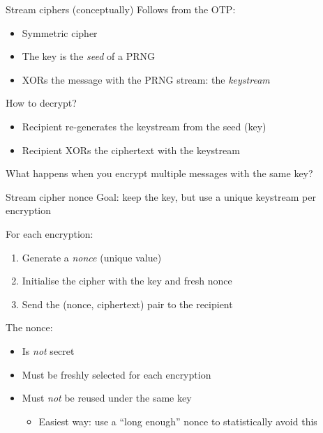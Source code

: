\begin{frame}{Stream ciphers (conceptually)}
  Follows from the OTP:
  \begin{itemize}[<+(1)->]
    \item Symmetric cipher
    \item The key is the \emph{seed} of a PRNG
    \item XORs the message with the PRNG stream: the \emph{keystream}
  \end{itemize}

  \vspace*{1em}

  \pause
  How to decrypt?
  \begin{itemize}[<+(1)->]
    \item Recipient re-generates the keystream from the seed (key)
    \item Recipient XORs the ciphertext with the keystream
  \end{itemize}

  \vspace*{1em}

  \pause
  What happens when you encrypt multiple messages with the same key?
\end{frame}

\begin{frame}{Stream cipher nonce}
  Goal: keep the key, but use a unique keystream per encryption

  \pause
  For each encryption:
  \begin{enumerate}[<+(1)->]
    \item Generate a \emph{nonce} (unique value)
    \item Initialise the cipher with the key and fresh nonce
    \item Send the (nonce, ciphertext) pair to the recipient
  \end{enumerate}

  \pause
  The nonce:
  \begin{itemize}[<+(1)->]
    \item Is \emph{not} secret
    \item Must be freshly selected for each encryption
    \item Must \emph{not} be reused under the same key
    \begin{itemize}
      \item Easiest way: use a \enquote{long enough} nonce to statistically avoid this
    \end{itemize}
  \end{itemize}

\end{frame}

